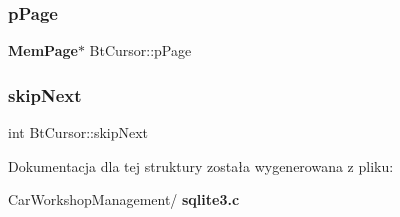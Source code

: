\subsubsection{pPage}
{\footnotesize\ttfamily \textbf{ Mem\+Page}$\ast$ Bt\+Cursor\+::p\+Page}

\mbox{\label{struct_bt_cursor_ab1dfdbd6c9ec6cdb21cdb5deaa6d5ecb}} 
\subsubsection{skipNext}
{\footnotesize\ttfamily int Bt\+Cursor\+::skip\+Next}



Dokumentacja dla tej struktury została wygenerowana z pliku\+:\begin{DoxyCompactItemize}
\item 
Car\+Workshop\+Management/\textbf{ sqlite3.\+c}\end{DoxyCompactItemize}
